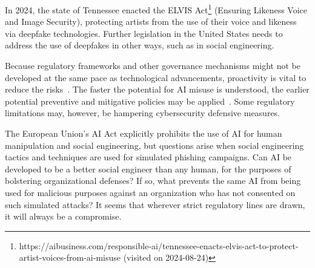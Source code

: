 In 2024, the state of Tennessee enacted the ELVIS Act\footnote{https://aibusiness.com/responsible-ai/tennessee-enacts-elvis-act-to-protect-artist-voices-from-ai-misuse (visited on 2024-08-24)} (Ensuring Likeness Voice and Image Security), protecting artists from the use of their voice and likeness via deepfake technologies. Further legislation in the United States needs to address the use of deepfakes in other ways, such as in social engineering.

Because regulatory frameworks and other governance mechanisms might not be developed at the same pace as technological advancements, proactivity is vital to reduce the risks~\citep{blauth_AI_Crime_Overview_Malicious_Use_Abuse_2022}. The faster the potential for AI misuse is understood, the earlier potential preventive and mitigative policies may be applied~\citep{king_AI_Crime_Interdisciplinary_Analysis_2019}. Some regulatory limitations may, however, be hampering cybersecurity defensive measures.

The European Union’s AI Act explicitly prohibits the use of AI for human manipulation and social engineering, but questions arise when social engineering tactics and techniques are used for simulated phishing campaigns. Can AI be developed to be a better social engineer than any human, for the purposes of bolstering organizational defenses? If so, what prevents the same AI from being used for malicious purposes against an organization who has not consented on such simulated attacks? It seems that wherever strict regulatory lines are drawn, it will always be a compromise.
